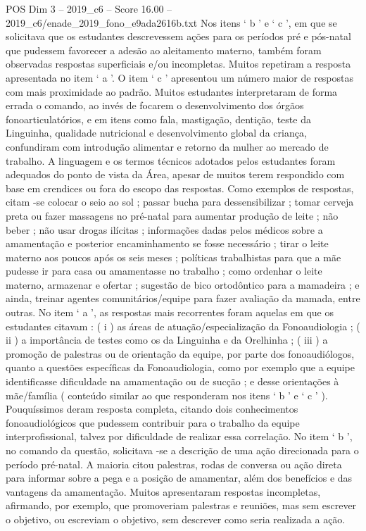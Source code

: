 \begin{textsample}{POS Dim 3 – 2019\_c6 – Score 16.00 – 2019\_c6/enade\_2019\_fono\_e9ada2616b.txt}
Nos itens ‘ b ’ e ‘ c ’, em que se solicitava que os estudantes descrevessem ações para os períodos pré e pós-natal que pudessem favorecer a adesão ao aleitamento materno, também foram observadas respostas superficiais e/ou incompletas.
Muitos repetiram a resposta apresentada no item ‘ a ’.
O item ‘ c ’ apresentou um número maior de respostas com mais proximidade ao padrão.
Muitos estudantes interpretaram de forma errada o comando, ao invés de focarem o desenvolvimento dos órgãos fonoarticulatórios, e em itens como fala, mastigação, dentição, teste da Linguinha, qualidade nutricional e desenvolvimento global da criança, confundiram com introdução alimentar e retorno da mulher ao mercado de trabalho.
A linguagem e os termos técnicos adotados pelos estudantes foram adequados do ponto de vista da Área, apesar de muitos terem respondido com base em crendices ou fora do escopo das respostas.
Como exemplos de respostas, citam -se colocar o seio ao sol ; passar bucha para dessensibilizar ; tomar cerveja preta ou fazer massagens no pré-natal para aumentar produção de leite ; não beber ; não usar drogas ilícitas ; informações dadas pelos médicos sobre a amamentação e posterior encaminhamento se fosse necessário ; tirar o leite materno aos poucos após os seis meses ; políticas trabalhistas para que a mãe pudesse ir para casa ou amamentasse no trabalho ; como ordenhar o leite materno, armazenar e ofertar ; sugestão de bico ortodôntico para a mamadeira ; e ainda, treinar agentes comunitários/equipe para fazer avaliação da mamada, entre outras.
No item ‘ a ’, as respostas mais recorrentes foram aquelas em que os estudantes citavam : ( i ) as áreas de atuação/especialização da Fonoaudiologia ; ( ii ) a importância de testes como os da Linguinha e da Orelhinha ; ( iii ) a promoção de palestras ou de orientação da equipe, por parte dos fonoaudiólogos, quanto a questões específicas da Fonoaudiologia, como por exemplo que a equipe identificasse dificuldade na amamentação ou de sucção ; e desse orientações à mãe/família ( conteúdo similar ao que responderam nos itens ‘ b ’ e ‘ c ’ ).
Pouquíssimos deram resposta completa, citando dois conhecimentos fonoaudiológicos que pudessem contribuir para o trabalho da equipe interprofissional, talvez por dificuldade de realizar essa correlação.
No item ‘ b ’, no comando da questão, solicitava -se a descrição de uma ação direcionada para o período pré-natal.
A maioria citou palestras, rodas de conversa ou ação direta para informar sobre a pega e a posição de amamentar, além dos benefícios e das vantagens da amamentação.
Muitos apresentaram respostas incompletas, afirmando, por exemplo, que promoveriam palestras e reuniões, mas sem escrever o objetivo, ou escreviam o objetivo, sem descrever como seria realizada a ação.

\end{textsample}
